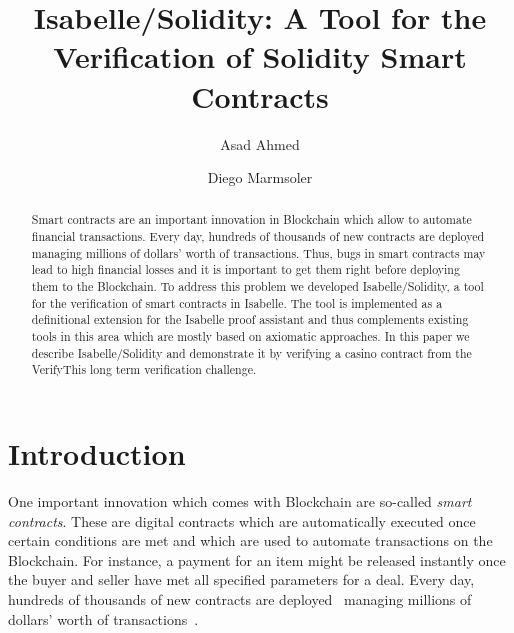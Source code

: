 \documentclass[a4paper,UKenglish,cleveref, autoref, thm-restate]{oasics-v2021}
\title{Isabelle/Solidity: A Tool  for the Verification of Solidity Smart Contracts} %
\author{Asad {Ahmed}}{University of Exeter, Exeter EX4 4PY, UK \and \url{https://sites.google.com/view/asad-ahmed/home} }{a.ahmed6@exeter.ac.uk}{https://orcid.org/0000-0001-8276-0975}{}%
\author{Diego Marmsoler}{University of Exeter, Exeter EX4 4PY, UK}{d.marmsoler@exeter.ac.uk}{[https://orcid.org/0000-0003-2859-7673]}{}
\begin{document}
\maketitle

\begin{abstract}
	Smart contracts are an important innovation in Blockchain which allow to automate financial transactions.
	Every day, hundreds of thousands of new contracts are deployed managing millions of dollars' worth of transactions.
	Thus, bugs in smart contracts may lead to high financial losses and it is important to get them right before deploying them to the Blockchain.
	To address this problem we developed Isabelle/Solidity, a tool for the verification of smart contracts in Isabelle.
	The tool is implemented as a definitional extension for the Isabelle proof assistant and thus complements existing tools in this area which are mostly based on axiomatic approaches.
	In this paper we describe Isabelle/Solidity and demonstrate it by verifying a casino contract from the VerifyThis long term verification challenge.
\end{abstract}

\section{Introduction}
\label{sec-intro}
One important innovation which comes with Blockchain are so-called \emph{smart contracts}.
These are digital contracts which are automatically executed once certain conditions are met and which are used to automate transactions on the Blockchain.
For instance, a payment for an item might be released instantly once the buyer and seller have met all specified parameters for a deal.
Every day, hundreds of thousands of new contracts are deployed~\cite{etherscan:contracts} managing millions of dollars' worth of transactions~\cite{ycharts:transactions}.
\end{document}
